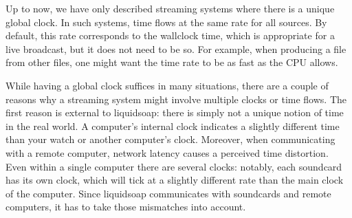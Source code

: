 
Up to now, we have only described streaming systems where there is
a unique global clock. In such systems, time flows at the same rate
for all sources.
By default, this rate corresponds to the wallclock time,
which is appropriate for a live broadcast,
but it does not need to be so.
For example, when producing a file from other files,
one might want the time rate to be as fast as the CPU allows.


While having a global clock suffices in many situations,
there are a couple of reasons why a streaming system might involve multiple
clocks or time flows.
The first reason is external to liquidsoap: there is simply
not a unique notion of time in the real world.
A computer's internal clock indicates a slightly different time
than your watch or another computer's clock.
Moreover, when communicating with a remote computer, network
latency causes a perceived time distortion.
Even within a single computer there are several clocks: notably, each
soundcard has its own clock, which will tick at a slightly different
rate than the main clock of the computer.
Since liquidsoap communicates with soundcards and remote computers,
it has to take those mismatches into account.

